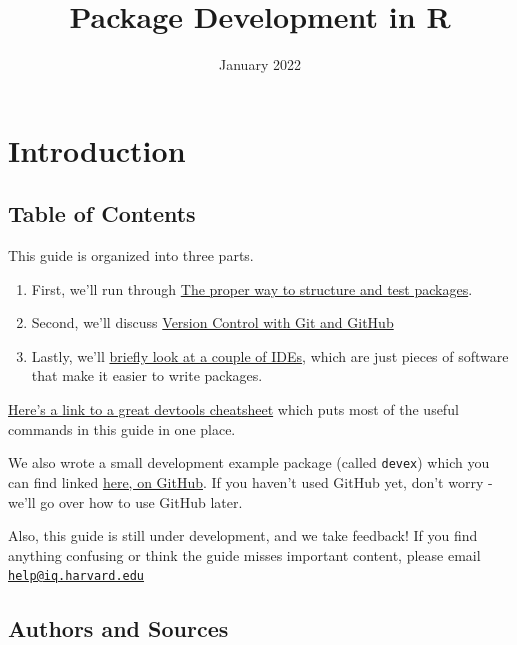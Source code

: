 \documentclass[
]{book}
\title{Package Development in R}
\author{}
\date{\vspace{-2.5em}January 2022}
\providecommand{\tightlist}{%
  \setlength{\itemsep}{0pt}\setlength{\parskip}{0pt}}
\begin{document}
\maketitle

{
\setcounter{tocdepth}{1}
\tableofcontents
}
\hypertarget{introduction}{%
\chapter*{Introduction}\label{introduction}}

\hypertarget{table-of-contents}{%
\section*{Table of Contents}\label{table-of-contents}}

This guide is organized into three parts.

\begin{enumerate}
\def\labelenumi{\arabic{enumi}.}
\tightlist
\item
  First, we'll run through \href{./package-development.html}{The proper way to structure and test packages}.
\item
  Second, we'll discuss \href{./version-control.html}{Version Control with Git and GitHub}
\item
  Lastly, we'll \href{./integrated-development-environments.html}{briefly look at a couple of IDEs}, which are just pieces of software that make it easier to write packages.
\end{enumerate}

\href{https://www.rstudio.com/wp-content/uploads/2015/03/devtools-cheatsheet.pdf}{Here's a link to a great devtools cheatsheet} which puts most of the useful commands in this guide in one place.

We also wrote a small development example package (called \texttt{devex}) which you can find linked \href{https://github.com/IQSS/dss-rbuild/tree/master/devex}{here, on GitHub}. If you haven't used GitHub yet, don't worry - we'll go over how to use GitHub later.

Also, this guide is still under development, and we take feedback! If you find anything confusing or think the guide misses important content, please email \href{mailto:help@iq.harvard.edu}{\nolinkurl{help@iq.harvard.edu}}

\hypertarget{authors-and-sources}{%
\section*{Authors and Sources}\label{authors-and-sources}}
\end{document}
